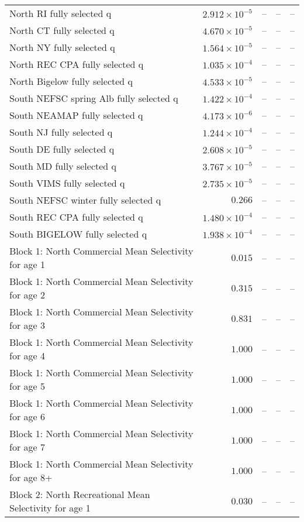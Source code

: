 \documentclass[
]{article}
\begin{document}
\begin{landscape}
\begin{longtable}[t]{lrrrr}
North RI fully selected q & $2.912\times 10^{-5}$ & -- & -- & --\\
North CT fully selected q & $4.670\times 10^{-5}$ & -- & -- & --\\
North NY fully selected q & $1.564\times 10^{-5}$ & -- & -- & --\\
\addlinespace
North REC CPA fully selected q & $1.035\times 10^{-4}$ & -- & -- & --\\
North Bigelow fully selected q & $4.533\times 10^{-5}$ & -- & -- & --\\
South NEFSC spring Alb fully selected q & $1.422\times 10^{-4}$ & -- & -- & --\\
South NEAMAP fully selected q & $4.173\times 10^{-6}$ & -- & -- & --\\
South NJ fully selected q & $1.244\times 10^{-4}$ & -- & -- & --\\
\addlinespace
South DE fully selected q & $2.608\times 10^{-5}$ & -- & -- & --\\
South MD fully selected q & $3.767\times 10^{-5}$ & -- & -- & --\\
South VIMS fully selected q & $2.735\times 10^{-5}$ & -- & -- & --\\
South NEFSC winter fully selected q & $0.266$ & -- & -- & --\\
South REC CPA fully selected q & $1.480\times 10^{-4}$ & -- & -- & --\\
\addlinespace
South BIGELOW fully selected q & $1.938\times 10^{-4}$ & -- & -- & --\\
Block 1: North Commercial Mean Selectivity for age 1 & $0.015$ & -- & -- & --\\
Block 1: North Commercial Mean Selectivity for age 2 & $0.315$ & -- & -- & --\\
Block 1: North Commercial Mean Selectivity for age 3 & $0.831$ & -- & -- & --\\
Block 1: North Commercial Mean Selectivity for age 4 & $1.000$ & -- & -- & --\\
\addlinespace
Block 1: North Commercial Mean Selectivity for age 5 & $1.000$ & -- & -- & --\\
Block 1: North Commercial Mean Selectivity for age 6 & $1.000$ & -- & -- & --\\
Block 1: North Commercial Mean Selectivity for age 7 & $1.000$ & -- & -- & --\\
Block 1: North Commercial Mean Selectivity for age 8+ & $1.000$ & -- & -- & --\\
Block 2: North Recreational Mean Selectivity for age 1 & $0.030$ & -- & -- & --\\

\end{longtable}
\end{landscape}
\end{document}
